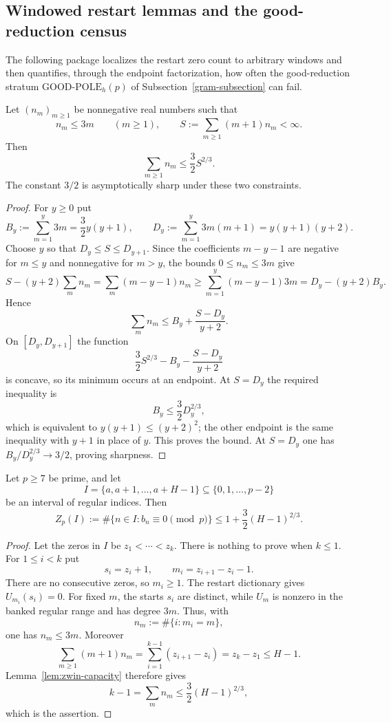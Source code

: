 \subsection{Windowed restart lemmas and the good-reduction census}
\label{sec:zwin-window}

The following package localizes the restart zero count to arbitrary
windows and then quantifies, through the endpoint factorization, how
often the good-reduction stratum
$\mathrm{GOOD\mbox{-}POLE}_h(p)$ of
Subsection~\ref{gram-subsection} can fail.

\begin{lemma}\label{lem:zwin-capacity}
Let $(n_m)_{m\geq1}$ be nonnegative real numbers such that
\[
 n_m\leq 3m
 \qquad(m\geq1),
 \qquad
 S:=\sum_{m\geq1}(m+1)n_m<\infty.
\]
Then
\[
 \sum_{m\geq1}n_m\leq \frac32 S^{2/3}.
\]
The constant $3/2$ is asymptotically sharp under these two constraints.
\end{lemma}

\begin{proof}
For $y\geq0$ put
\[
 B_y:=\sum_{m=1}^y3m=\frac32y(y+1),
 \qquad
 D_y:=\sum_{m=1}^y3m(m+1)=y(y+1)(y+2).
\]
Choose $y$ so that $D_y\leq S\leq D_{y+1}$.  Since the coefficients
$m-y-1$ are negative for $m\leq y$ and nonnegative for $m>y$, the bounds
$0\leq n_m\leq3m$ give
\[
 S-(y+2)\sum_m n_m
 =\sum_m(m-y-1)n_m
 \geq\sum_{m=1}^y(m-y-1)3m
 =D_y-(y+2)B_y.
\]
Hence
\[
 \sum_m n_m\leq B_y+\frac{S-D_y}{y+2}.
\]
On $[D_y,D_{y+1}]$ the function
\[
 \frac32S^{2/3}-B_y-\frac{S-D_y}{y+2}
\]
is concave, so its minimum occurs at an endpoint.  At $S=D_y$ the required
inequality is
\[
 B_y\leq\frac32D_y^{2/3},
\]
which is equivalent to $y(y+1)\leq(y+2)^2$; the other endpoint is the same
inequality with $y+1$ in place of $y$.  This proves the bound.  At
$S=D_y$ one has $B_y/D_y^{2/3}\to3/2$, proving sharpness.
\end{proof}

\begin{lemma}\label{lem:zwin-window}
Let $p\geq7$ be prime, and let
\[
 I=\{a,a+1,\ldots,a+H-1\}\subseteq\{0,1,\ldots,p-2\}
\]
be an interval of regular indices.  Then
\[
 Z_p(I):=\#\{n\in I:b_n\equiv0\pmod p\}
 \leq 1+\frac32(H-1)^{2/3}.
\]
\end{lemma}

\begin{proof}
Let the zeros in $I$ be $z_1<\cdots<z_k$.  There is nothing to prove when
$k\leq1$.  For $1\leq i<k$ put
\[
 s_i=z_i+1,
 \qquad
 m_i=z_{i+1}-z_i-1.
\]
There are no consecutive zeros, so $m_i\geq1$.  The restart dictionary gives
$U_{m_i}(s_i)=0$.  For fixed $m$, the starts $s_i$ are distinct, while
$U_m$ is nonzero in the banked regular range and has degree $3m$.  Thus, with
\[
 n_m:=\#\{i:m_i=m\},
\]
one has $n_m\leq3m$.  Moreover
\[
 \sum_{m\geq1}(m+1)n_m
 =\sum_{i=1}^{k-1}(z_{i+1}-z_i)
 =z_k-z_1
 \leq H-1.
\]
Lemma~\ref{lem:zwin-capacity} therefore gives
\[
 k-1=\sum_mn_m\leq\frac32(H-1)^{2/3},
\]
which is the assertion.
\end{proof}

